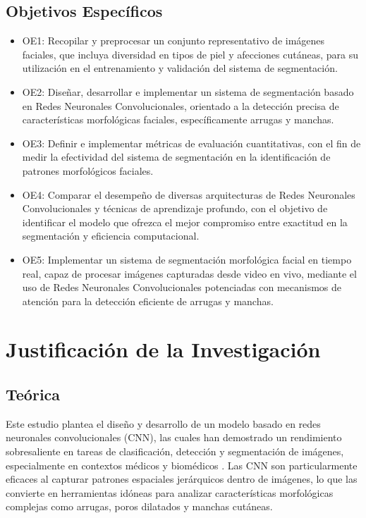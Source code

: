 \subsection{Objetivos Específicos}
\newcommand{\Objone}{
Recopilar y preprocesar un conjunto representativo de imágenes faciales, que incluya diversidad en tipos de piel y afecciones cutáneas, para su utilización en el entrenamiento y validación del sistema de segmentación.
}

\newcommand{\Objtwo}{
Diseñar, desarrollar e implementar un sistema de segmentación basado en Redes Neuronales Convolucionales, orientado a la detección precisa de características morfológicas faciales, específicamente arrugas y manchas.
}

\newcommand{\Objthree}{
Definir e implementar métricas de evaluación cuantitativas, con el fin de medir la efectividad del sistema de segmentación en la identificación de patrones morfológicos faciales.
}

\newcommand{\Objfour}{
Comparar el desempeño de diversas arquitecturas de Redes Neuronales Convolucionales y técnicas de aprendizaje profundo, con el objetivo de identificar el modelo que ofrezca el mejor compromiso entre exactitud en la segmentación y eficiencia computacional.
}
\newcommand{\Objfive}{
Implementar un sistema de segmentación morfológica facial en tiempo real, capaz de procesar imágenes capturadas desde video en vivo, mediante el uso de Redes Neuronales Convolucionales potenciadas con mecanismos de atención para la detección eficiente de arrugas y manchas.
}

\begin{itemize}
	\item OE1: {\Objone}
	\item OE2: {\Objtwo}
	\item OE3: {\Objthree}
	\item OE4: {\Objfour}
	\item OE5: {\Objfive}
\end{itemize}


\section{Justificación de la Investigación}

\subsection{Teórica}

Este estudio plantea el diseño y desarrollo de un modelo basado en redes neuronales convolucionales (CNN), las cuales han demostrado un rendimiento sobresaliente en tareas de clasificación, detección y segmentación de imágenes, especialmente en contextos médicos y biomédicos \parencite{esteva2017}. Las CNN son particularmente eficaces al capturar patrones espaciales jerárquicos dentro de imágenes, lo que las convierte en herramientas idóneas para analizar características morfológicas complejas como arrugas, poros dilatados y manchas cutáneas.

